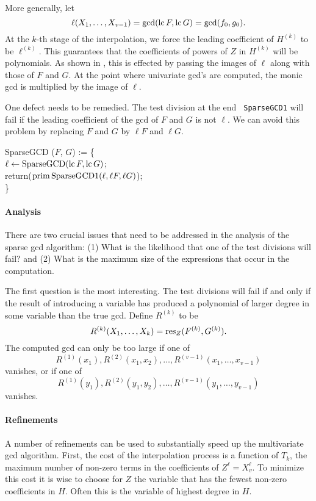 More generally, let
\[
\ell(X_1, \ldots, X_{v-1}) = \gcd(\operatorname{lc} F, \operatorname{lc} G) = \gcd (f_0, g_0).
\]
At the $k$-th stage of the interpolation, we force the leading
coefficient of $H^{(k)}$ to be $\ell^{(k)}$.  This guarantees that the
coefficients of powers of $Z$ in $H^{(k)}$ will be polynomials.  As
shown in , this is effected by passing the
images of $\ell$ along with those of $F$ and $G$.  At the point where
univariate {\sc gcd}'s are computed, the monic {\sc gcd} is multiplied
by the image of $\ell$.

One defect needs to be remedied.  The test division at the end {\tt
SparseGCD1} will fail if the leading coefficient of the {\sc gcd} of
$F$ and $G$ is not $\ell$.  We can avoid this problem by replacing $F$
and $G$ by $\ell F$ and $\ell G$. 

\begindsacode
SparseGCD ($F$, $G$) := \{ \\
\> $\ell \leftarrow \mbox{SparseGCD}(\operatorname{lc} F, \operatorname{lc} G)$; \\
\> return($\operatorname{prim} \mbox{SparseGCD1}(\ell, \ell F, \ell G)$); \\
\> \}
\enddsacode

\paragraph{Analysis}

There are two crucial issues that need to be addressed in the analysis of
the sparse {\sc gcd} algorithm: (1) What is the likelihood that one of
the test divisions will fail? and (2) What is the maximum size of the
expressions that occur in the computation.  

The first question is the most interesting.  The test divisions will
fail if and only if the result of introducing a variable has produced
a polynomial of larger degree in some variable than the true {\sc
gcd}.  Define $R^{(k)}$ to be
\[
R^{(k)}(X_1, \ldots, X_k) = \mathop{\rm res}\nolimits_Z (F^{(k)}, G^{(k)}).
\]
The computed {\sc gcd} can only be too large if one of 
\[
R^{(1)}(x_1), R^{(2)}(x_1, x_2), \ldots, R^{(v-1)}(x_1, \ldots, x_{v-1})
\]
vanishes, or if one of
\[
R^{(1)}(y_1), R^{(2)}(y_1, y_2), \ldots, R^{(v-1)}(y_1, \ldots, y_{v-1})
\]
vanishes.

\paragraph{Refinements}

A number of refinements can be used to substantially speed up the
multivariate {\sc gcd} algorithm.  First, the cost of the
interpolation process is a function of $T_k$, the maximum number of
non-zero terms in the coefficients of $Z^{\ell} = X_v^{\ell}$.  To
minimize this cost it is wise to choose for $Z$ the variable that has
the fewest non-zero coefficients in $H$.  Often this is the variable
of highest degree in $H$.

